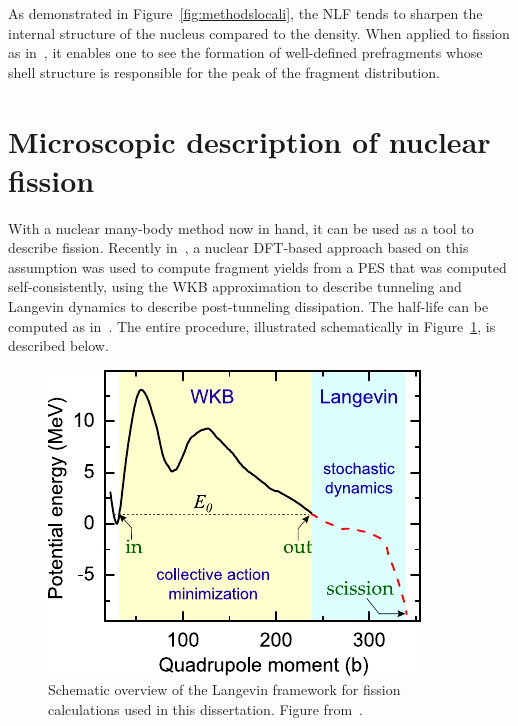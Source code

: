 As demonstrated in Figure~\ref{fig:methodslocali}, the NLF tends to sharpen the internal structure of the nucleus compared to the density. When applied to fission as in~\cite{Sadhukhan2017}, it enables one to see the formation of well-defined prefragments whose shell structure is responsible for the peak of the fragment distribution.


\section{Microscopic description of nuclear fission}\label{sect:fissionmethod}
With a nuclear many-body method now in hand, it can be used as a tool to describe fission. Recently in~\cite{Sadhukhan2016}, a nuclear DFT-based approach based on this assumption was used to compute fragment yields from a PES that was computed self-consistently, using the WKB approximation to describe tunneling and Langevin dynamics to describe post-tunneling dissipation. The half-life can be computed as in~\cite{Sadhukhan2013}. The entire procedure, illustrated schematically in Figure~\ref{fig:methodsoverview}, is described below.

\begin{figure}
	\centering
	\includegraphics[width=0.5\linewidth]{TeX_files/methods_overview}
	\caption[Schematic overview of the Langevin framework for fission calculations used in this dissertation]{Schematic overview of the Langevin framework for fission calculations used in this dissertation. Figure from~\cite{Sadhukhan2016}.}
	\label{fig:methodsoverview}
\end{figure}

